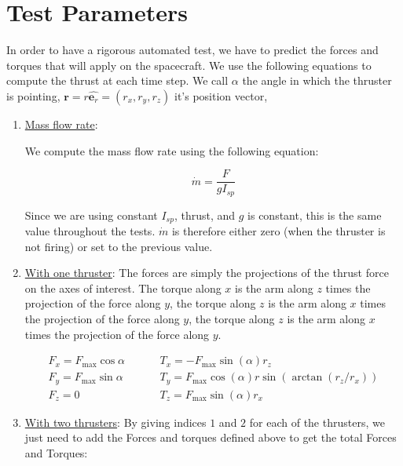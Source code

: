 \section{Test Parameters}


In order to have a rigorous automated test, we have to predict the forces and torques that will apply on the spacecraft. We use the following equations to compute the thrust at each time step. We call $\alpha$ the angle in which the thruster is pointing, $\bm r = r \hat{\bm e_r}= \left(r_x, r_y, r_z \right)$ it's position vector, 

\begin{enumerate}

\item{\underline{Mass flow rate}}: 

We compute the mass flow rate using the following equation:

\begin{equation}
\dot{m} = \frac{F}{g I_{sp}}
\end{equation}

Since we are using constant $I_{sp}$, thrust, and $g$ is constant, this is the same value throughout the tests. $\dot{m}$ is therefore either zero (when the thruster is not firing) or set to the previous value. 

\item{\underline{With one thruster}}: The forces are simply the projections of the thrust force on the axes of interest. The torque along $x$ is the arm along $z$ times the projection of the force along $y$, the torque along $z$ is the arm along $x$ times the projection of the force along $y$, the torque along $z$ is the arm along $x$ times the projection of the force along $y$. 

\begin{align}
F_x =F_{\mathrm{max}} \cos \alpha &\hspace{1cm} T_x = - F_{\mathrm{max}}\sin(\alpha) r_z \\ 
F_y = F_{\mathrm{max}} \sin \alpha &\hspace{1cm} T_y = F_{\mathrm{max}} \cos(\alpha) r \sin( \arctan(r_z/r_x)) \\ 
F_z = 0 &\hspace{1cm} T_z =  F_{\mathrm{max}} \sin(\alpha) r_x 
\end{align}


\item{\underline{With two thrusters}}: By giving indices $1$ and $2$ for each of the thrusters, we just need to add the Forces and torques defined above to get the total Forces and Torques:


\end{enumerate}
